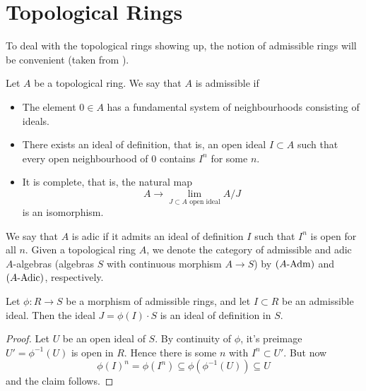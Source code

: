 \documentclass[../main.tex]{subfiles}
\begin{document}
\section{Topological Rings}
To deal with the topological rings showing up, the notion of admissible rings
will be convenient (taken from \cite[Tag 07E8]{stacks-project}).
\begin{defi}\label{def:admring}
  Let $A$ be a topological ring. We say that $A$ is admissible if
  \begin{itemize}
    \item The element $0 \in A$ has a fundamental system of neighbourhoods
      consisting of ideals.
    \item There exists an ideal of definition, that is, an open ideal $I
      \subset A$ such that every open neighbourhood of $0$ contains $I^n$ for
      some $n$.
    \item It is complete, that is, the natural map
      \begin{equation*}
        A \to \lim_{J \subset A \text{ open ideal}} A/J
      \end{equation*}
      is an isomorphism.
  \end{itemize}
  We say that $A$ is adic if it admits an ideal of definition $I$ such that 
  $I^n$ is open for all $n$.
  Given a topological ring $A$, we denote the category of admissible 
  and adic $A$-algebras (algebras $S$ with continuous morphism $A \to S$) by
  ${({A}\text-\mathrm{Adm})}$ and ${({A}\text-\mathrm{Adic})}$, respectively.
\end{defi}


\begin{lem} \label{lem:iodimage}
  Let $\phi: R \to S$ be a morphism of admissible rings, and let $I \subset R$ be an 
  admissible ideal. Then the ideal $J = \phi(I) \cdot S$ is an ideal of definition in 
  $S$.
\begin{proof}
  Let $U$ be an open ideal of $S$. By continuity of $\phi$, it's preimage
  $U' = \phi^{-1}(U)$ is open in $R$. Hence there is some $n$ with 
  $I^n \subset U'$. But now 
  $$\phi(I)^n = \phi(I^n) \subseteq \phi(\phi^{-1}(U)) \subseteq U$$
  and the claim follows.
\end{proof}
\end{lem}
\end{document}

